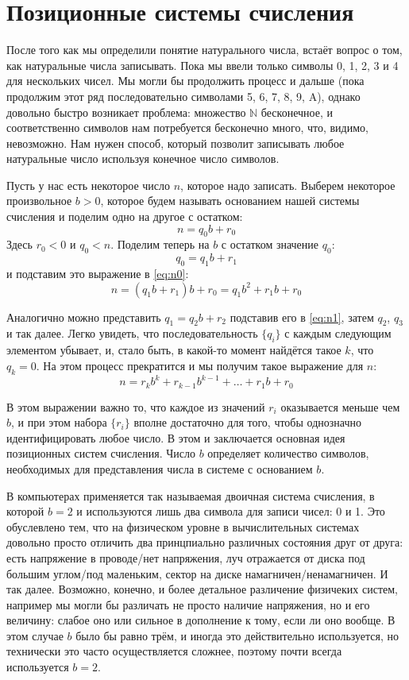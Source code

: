 \section{Позиционные системы счисления}

После того как мы определили понятие натурального числа, встаёт вопрос о том, как натуральные числа записывать. Пока мы ввели только символы 0, 1, 2, 3 и 4 для нескольких чисел. Мы могли бы продолжить процесс и дальше (пока продолжим этот ряд последовательно символами 5, 6, 7, 8, 9, A), однако довольно быстро возникает проблема: множество $\mathbb{N}$ бесконечное, и соответственно символов нам потребуется бесконечно много, что, видимо, невозможно. Нам нужен способ, который позволит записывать любое натуральные число используя конечное число символов.

Пусть у нас есть некоторое число $n$, которое надо записать. Выберем некоторое произвольное $b > 0$, которое будем называть основанием нашей системы счисления и поделим одно на другое с остатком:
\begin{equation}\label{eq:n0}
n = q_0b + r_0
\end{equation}
Здесь $r_0 < 0$ и $q_0 < n$. Поделим теперь на $b$ с остатком значение $q_0$: $$q_0 = q_1b + r_1$$ и подставим это выражение в \eqref{eq:n0}:
\begin{equation}\label{eq:n1}
n = (q_1b + r_1)b + r_0 = q_1b^2 + r_1b + r_0
\end{equation}

Аналогично можно представить $q_1 = q_2b + r_2$ подставив его в \eqref{eq:n1}, затем $q_2$, $q_3$ и так далее. Легко увидеть, что последовательность $\{q_i\}$ с каждым следующим элементом убывает, и, стало быть, в какой-то момент найдётся такое $k$, что $q_k = 0$. На этом процесс прекратится и мы получим такое выражение для $n$:
\begin{equation}\label{eq:nk}
n = r_kb^k + r_{k-1}b^{k-1} +\ldots + r_1b + r_0
\end{equation}

В этом выражении важно то, что каждое из значений $r_i$ оказывается меньше чем $b$, и при этом набора $\{r_i\}$ вполне достаточно для того, чтобы однозначно идентифицировать любое число. В этом и заключается основная идея позиционных систем счисления. Число $b$ определяет количество символов, необходимых для представления числа в системе с основанием $b$.

В компьютерах применяется так называемая двоичная система счисления, в которой $b=2$ и используются лишь два символа для записи чисел: 0 и 1. Это обуслевлено тем, что на физическом уровне в вычислительных системах довольно просто отличить два принцпиально различных состояния друг от друга: есть напряжение в проводе/нет напряжения, луч отражается от диска под большим углом/под маленьким, сектор на диске намагничен/ненамагничен. И так далее. Возможно, конечно, и более детальное различение физичеких систем, например мы могли бы различать не просто наличие напряжения, но и его величину: слабое оно или сильное в дополнение к тому, если ли оно вообще. В этом случае $b$ было бы равно трём, и иногда это действительно используется, но технически это часто осуществляется сложнее, поэтому почти всегда используется $b=2$.

